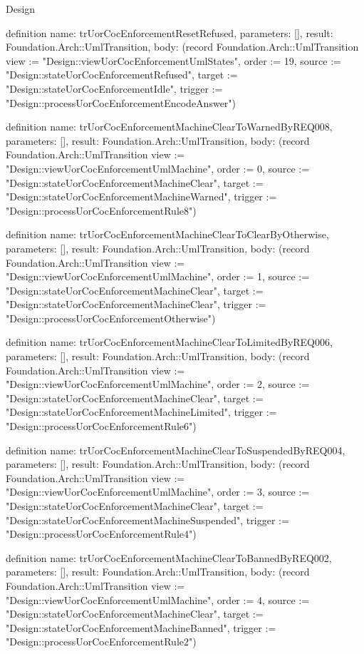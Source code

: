 \begin{lexlean}{Design}
\begin{semanticmodule}
definition{
  name: trUorCocEnforcementResetRefused,
  parameters: [],
  result: Foundation.Arch::UmlTransition,
  body: (record Foundation.Arch::UmlTransition {view := "Design::viewUorCocEnforcementUmlStates", order := 19, source := "Design::stateUorCocEnforcementRefused", target := "Design::stateUorCocEnforcementIdle", trigger := "Design::processUorCocEnforcementEncodeAnswer"})
}

definition{
  name: trUorCocEnforcementMachineClearToWarnedByREQ008,
  parameters: [],
  result: Foundation.Arch::UmlTransition,
  body: (record Foundation.Arch::UmlTransition {view := "Design::viewUorCocEnforcementUmlMachine", order := 0, source := "Design::stateUorCocEnforcementMachineClear", target := "Design::stateUorCocEnforcementMachineWarned", trigger := "Design::processUorCocEnforcementRule8"})
}

definition{
  name: trUorCocEnforcementMachineClearToClearByOtherwise,
  parameters: [],
  result: Foundation.Arch::UmlTransition,
  body: (record Foundation.Arch::UmlTransition {view := "Design::viewUorCocEnforcementUmlMachine", order := 1, source := "Design::stateUorCocEnforcementMachineClear", target := "Design::stateUorCocEnforcementMachineClear", trigger := "Design::processUorCocEnforcementOtherwise"})
}

definition{
  name: trUorCocEnforcementMachineClearToLimitedByREQ006,
  parameters: [],
  result: Foundation.Arch::UmlTransition,
  body: (record Foundation.Arch::UmlTransition {view := "Design::viewUorCocEnforcementUmlMachine", order := 2, source := "Design::stateUorCocEnforcementMachineClear", target := "Design::stateUorCocEnforcementMachineLimited", trigger := "Design::processUorCocEnforcementRule6"})
}

definition{
  name: trUorCocEnforcementMachineClearToSuspendedByREQ004,
  parameters: [],
  result: Foundation.Arch::UmlTransition,
  body: (record Foundation.Arch::UmlTransition {view := "Design::viewUorCocEnforcementUmlMachine", order := 3, source := "Design::stateUorCocEnforcementMachineClear", target := "Design::stateUorCocEnforcementMachineSuspended", trigger := "Design::processUorCocEnforcementRule4"})
}

definition{
  name: trUorCocEnforcementMachineClearToBannedByREQ002,
  parameters: [],
  result: Foundation.Arch::UmlTransition,
  body: (record Foundation.Arch::UmlTransition {view := "Design::viewUorCocEnforcementUmlMachine", order := 4, source := "Design::stateUorCocEnforcementMachineClear", target := "Design::stateUorCocEnforcementMachineBanned", trigger := "Design::processUorCocEnforcementRule2"})
}


\end{semanticmodule}
\end{lexlean}
